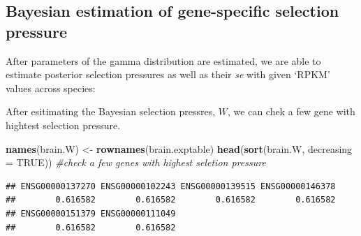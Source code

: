 \documentclass[]{book}
\newenvironment{Shaded}{\begin{snugshade}}{\end{snugshade}}
\newcommand{\CommentTok}[1]{\textcolor[rgb]{0.56,0.35,0.01}{\textit{#1}}}
\newcommand{\DataTypeTok}[1]{\textcolor[rgb]{0.13,0.29,0.53}{#1}}
\newcommand{\KeywordTok}[1]{\textcolor[rgb]{0.13,0.29,0.53}{\textbf{#1}}}
\newcommand{\NormalTok}[1]{#1}
\newcommand{\OperatorTok}[1]{\textcolor[rgb]{0.81,0.36,0.00}{\textbf{#1}}}
\newcommand{\OtherTok}[1]{\textcolor[rgb]{0.56,0.35,0.01}{#1}}
\newcommand{\StringTok}[1]{\textcolor[rgb]{0.31,0.60,0.02}{#1}}
\begin{document}
\hypertarget{bayesian-estimation-of-gene-specific-selection-pressure}{%
\subsection{Bayesian estimation of gene-specific selection pressure}\label{bayesian-estimation-of-gene-specific-selection-pressure}}

After parameters of the gamma distribution are estimated, we are able to estimate posterior selection pressures as well as their \emph{se} with given `RPKM' values across species:

\begin{Shaded}
\end{Shaded}

After esitimating the Bayesian selection pressres, \(W\), we can chek a few gene with hightest selection pressure.

\begin{Shaded}
\begin{Highlighting}[]
\KeywordTok{names}\NormalTok{(brain.W) <-}\StringTok{ }\KeywordTok{rownames}\NormalTok{(brain.exptable)}
\KeywordTok{head}\NormalTok{(}\KeywordTok{sort}\NormalTok{(brain.W, }\DataTypeTok{decreasing =} \OtherTok{TRUE}\NormalTok{)) }\CommentTok{#check a few genes with highest seletion pressure}
\end{Highlighting}
\end{Shaded}

\begin{verbatim}
## ENSG00000137270 ENSG00000102243 ENSG00000139515 ENSG00000146378 
##        0.616582        0.616582        0.616582        0.616582 
## ENSG00000151379 ENSG00000111049 
##        0.616582        0.616582
\end{verbatim}
\end{document}
